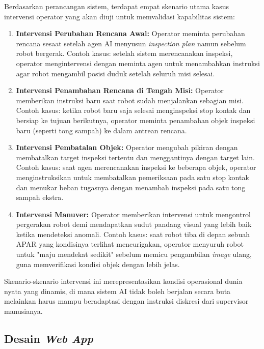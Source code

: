 Berdasarkan perancangan sistem, terdapat empat skenario utama kasus intervensi operator yang akan diuji untuk memvalidasi kapabilitas sistem:

\begin{enumerate}
    \item \textbf{Intervensi Perubahan Rencana Awal:} 
    Operator meminta perubahan rencana sesaat setelah agen AI menyusun \textit{inspection plan} namun sebelum robot bergerak. Contoh kasus: setelah sistem merencanakan inspeksi, operator mengintervensi dengan meminta agen untuk menambahkan instruksi agar robot mengambil posisi duduk setelah seluruh misi selesai.
    
    \item \textbf{Intervensi Penambahan Rencana di Tengah Misi:} 
    Operator memberikan instruksi baru saat robot sudah menjalankan sebagian misi. Contoh kasus: ketika robot baru saja selesai menginspeksi stop kontak dan bersiap ke tujuan berikutnya, operator meminta penambahan objek inspeksi baru (seperti tong sampah) ke dalam antrean rencana.
    
    \item \textbf{Intervensi Pembatalan Objek:} 
    Operator mengubah pikiran dengan membatalkan target inspeksi tertentu dan menggantinya dengan target lain. Contoh kasus: saat agen merencanakan inspeksi ke beberapa objek, operator menginstruksikan untuk membatalkan pemeriksaan pada satu stop kontak dan menukar beban tugasnya dengan menambah inspeksi pada satu tong sampah ekstra.
    
    \item \textbf{Intervensi Manuver:} 
    Operator memberikan intervensi untuk mengontrol pergerakan robot demi mendapatkan sudut pandang visual yang lebih baik ketika mendeteksi anomali. Contoh kasus: saat robot tiba di depan sebuah APAR yang kondisinya terlihat mencurigakan, operator menyuruh robot untuk "maju mendekat sedikit" sebelum memicu pengambilan \textit{image} ulang, guna memverifikasi kondisi objek dengan lebih jelas.
\end{enumerate}

Skenario-skenario intervensi ini merepresentasikan kondisi operasional dunia nyata yang dinamis, di mana sistem AI tidak boleh berjalan secara buta melainkan harus mampu beradaptasi dengan instruksi diskresi dari supervisor manusianya.

\subsection{Desain \textit{Web App}}

